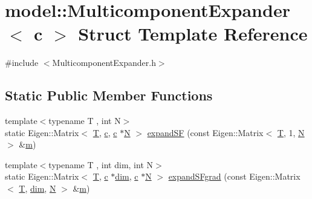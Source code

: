 \hypertarget{structmodel_1_1_multicomponent_expander}{}\section{model\+:\+:Multicomponent\+Expander$<$ c $>$ Struct Template Reference}
\label{structmodel_1_1_multicomponent_expander}


{\ttfamily \#include $<$Multicomponent\+Expander.\+h$>$}

\subsection*{Static Public Member Functions}
\begin{DoxyCompactItemize}
\item 
{\footnotesize template$<$typename T , int N$>$ }\\static Eigen\+::\+Matrix$<$ \hyperlink{_spline_node_base__corder1_8h_a82692d3a5502b91460591f1d5504314a}{T}, \hyperlink{plot_cells_8m_aa49cfdd4fa4d74d71f78a001a1b635d0}{c}, \hyperlink{plot_cells_8m_aa49cfdd4fa4d74d71f78a001a1b635d0}{c} $\ast$\hyperlink{thompson__tetrahedron_8m_a7823765a845eb81829f110d8337f81ae}{N} $>$ \hyperlink{structmodel_1_1_multicomponent_expander_a634ca1183b0171f1d60f9152cd2d4af2}{expand\+S\+F} (const Eigen\+::\+Matrix$<$ \hyperlink{_spline_node_base__corder1_8h_a82692d3a5502b91460591f1d5504314a}{T}, 1, \hyperlink{thompson__tetrahedron_8m_a7823765a845eb81829f110d8337f81ae}{N} $>$ \&\hyperlink{_longest_processing_time_8m_aa45df908642118b77cda186b3250197c}{m})
\item 
{\footnotesize template$<$typename T , int dim, int N$>$ }\\static Eigen\+::\+Matrix$<$ \hyperlink{_spline_node_base__corder1_8h_a82692d3a5502b91460591f1d5504314a}{T}, \hyperlink{plot_cells_8m_aa49cfdd4fa4d74d71f78a001a1b635d0}{c} $\ast$\hyperlink{plot_nd_a_8m_a382f3ca768b275b8d563604f7fc7df73}{dim}, \hyperlink{plot_cells_8m_aa49cfdd4fa4d74d71f78a001a1b635d0}{c} $\ast$\hyperlink{thompson__tetrahedron_8m_a7823765a845eb81829f110d8337f81ae}{N} $>$ \hyperlink{structmodel_1_1_multicomponent_expander_a39deee77c15e6a87e81b1235b9063701}{expand\+S\+Fgrad} (const Eigen\+::\+Matrix$<$ \hyperlink{_spline_node_base__corder1_8h_a82692d3a5502b91460591f1d5504314a}{T}, \hyperlink{plot_nd_a_8m_a382f3ca768b275b8d563604f7fc7df73}{dim}, \hyperlink{thompson__tetrahedron_8m_a7823765a845eb81829f110d8337f81ae}{N} $>$ \&\hyperlink{_longest_processing_time_8m_aa45df908642118b77cda186b3250197c}{m})

\end{DoxyCompactItemize}
